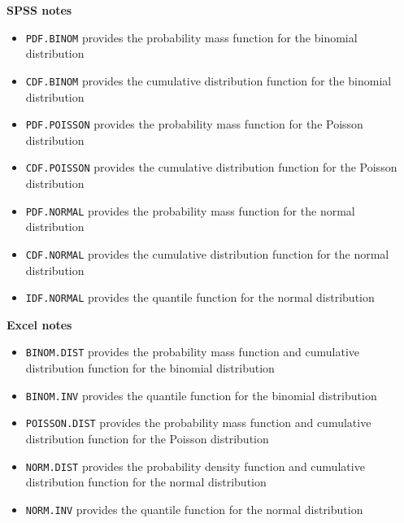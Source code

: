 \documentclass[a4paper, fleqn]{article}
\begin{document}
\newpage
\noindent
\textbf{SPSS notes} 
\begin{itemize}
  \item \texttt{PDF.BINOM} provides the probability mass function for the binomial distribution
  \item \texttt{CDF.BINOM} provides the cumulative distribution function for the binomial distribution
  \item \texttt{PDF.POISSON} provides the probability mass function for the Poisson distribution
  \item \texttt{CDF.POISSON} provides the cumulative distribution function for the Poisson distribution
  \item \texttt{PDF.NORMAL} provides the probability mass function for the normal distribution
  \item \texttt{CDF.NORMAL} provides the cumulative distribution function for the normal distribution
  \item \texttt{IDF.NORMAL} provides the quantile function for the normal distribution
\end{itemize}

\noindent
\textbf{Excel notes} 
\begin{itemize}
  \item \texttt{BINOM.DIST} provides the probability mass function and cumulative distribution function for the binomial distribution
  \item \texttt{BINOM.INV} provides the quantile function for the binomial distribution
  \item \texttt{POISSON.DIST} provides the probability mass function and cumulative distribution function for the Poisson distribution
  \item \texttt{NORM.DIST} provides the probability density function and cumulative distribution function for the normal distribution
  \item \texttt{NORM.INV} provides the quantile function for the normal distribution
\end{itemize}
\end{document}
